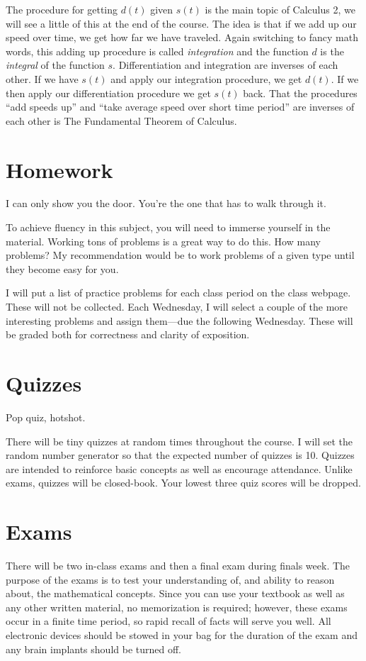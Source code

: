\documentclass[12pt]{article}
\begin{document}
The procedure for getting $d(t)$ given $s(t)$ is the main topic of Calculus 2, we will see a little of this at the end of the course.  The idea is that if we add up our speed over time, we get how far we have traveled. Again switching to fancy math words, this adding up procedure is called \emph{integration} and the function $d$ is the \emph{integral} of the function $s$.  Differentiation and integration are inverses of each other. If we have $s(t)$ and apply our integration procedure, we get $d(t)$.  If we then apply our differentiation procedure we get $s(t)$ back.  That the procedures ``add speeds up'' and ``take average speed over short time period'' are inverses of each other is The Fundamental Theorem of Calculus.


\section*{Homework} 
\epigraph{I can only show you the door. You're the one that has to walk through it.}{}
To achieve fluency in this subject, you will need to immerse yourself in the material.  
Working tons of problems is a great way to do this.  How many problems?  
My recommendation would be to work problems of a given type until they become easy for you.

I will put a list of practice problems for each class period on the class webpage.  These will not be collected.  
Each Wednesday, I will select a couple of the more interesting problems and assign them---due the following Wednesday.
These will be graded both for correctness and clarity of exposition.

\section*{Quizzes}
\epigraph{Pop quiz, hotshot.}{}
There will be tiny quizzes at random times throughout the course.  I will set the random number generator so that the expected number of quizzes is 10.
Quizzes are intended to reinforce basic concepts as well as encourage attendance.
Unlike exams, quizzes will be closed-book.  Your lowest three quiz scores will be dropped.

\section*{Exams}
There will be two in-class exams and then a final exam during finals week. 
The purpose of the exams is to test your understanding of, and ability to reason about, the mathematical concepts. Since you can use your textbook as well as any other written material, no memorization is required; however, these exams occur in a finite time period, so rapid recall of facts will serve you well.  All electronic devices should be stowed in your bag for the duration of the exam and any brain implants should be turned off.
\end{document}
